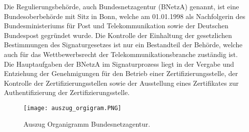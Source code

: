 Die Regulierungsbehörde, auch Bundesnetzagentur (BNetzA) genannt, ist eine Bundesoberbehörde mit Sitz in Bonn, welche am 01.01.1998 als Nachfolgerin des Bundesministeriums für Post und Telekommunikation sowie der Deutschen Bundespost gegründet wurde. Die Kontrolle der Einhaltung der gesetzlichen Bestimmungen des Signaturgesetzes ist nur ein Bestandteil der Behörde, welche auch für das Wettbewerbsrecht der Telekommunikationsbranche zuständig ist. Die Hauptaufgaben der BNetzA im Signaturprozess liegt in der Vergabe und Entziehung der Genehmigungen für den Betrieb einer Zertifizierungsstelle, der Kontrolle der Zertifizierungsstellen sowie der Ausstellung eines Zertifikates zur Authentifizierung der Zertifizierungsstelle. \cite{standdeswissens3}\cite{regBeh1}
\begin{figure}[!ht]
    \centering
    \texttt{[image: auszug\_orgigram.PNG]}
    \caption[Auszug Organigramm Bundesnetzagentur]{\small{Auszug Organigramm Bundesnetzagentur. \cite{BNetzA1}}}
\end{figure}